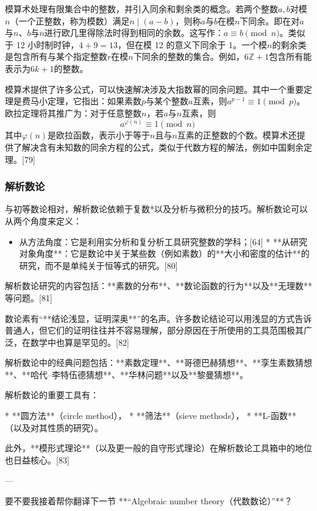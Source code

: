 模算术处理有限集合中的整数，并引入同余和剩余类的概念。若两个整数$a, b$对模$n$（一个正整数，称为模数）满足$n \mid (a-b)$，则称$a$与$b$在模$n$下同余。即在对$a$与$n$、$b$与$n$进行欧几里得除法时得到相同的余数。这写作：$a \equiv b \pmod{n}$。类似于 12 小时制时钟，$4 + 9 = 13$，但在模 12 的意义下同余于 1。一个模$n$的剩余类是包含所有与某个指定整数$r$在模$n$下同余的整数的集合。例如，$6\mathbb{Z} + 1$包含所有能表示为$6k+1$的整数。

模算术提供了许多公式，可以快速解决涉及大指数幂的同余问题。其中一个重要定理是费马小定理，它指出：如果素数$p$与某个整数$a$互素，则$a^{p-1} \equiv 1 \pmod{p}$。欧拉定理将其推广为：对于任意整数$n$，若$a$与$n$互素，则
$$
a^{\varphi(n)} \equiv 1 \pmod{n}~
$$
其中$\varphi(n)$是欧拉函数，表示小于等于$n$且与$n$互素的正整数的个数。模算术还提供了解决含有未知数的同余方程的公式，类似于代数方程的解法，例如中国剩余定理。[79]
\subsubsection{解析数论}
与初等数论相对，解析数论依赖于复数*以及分析与微积分的技巧。解析数论可以从两个角度来定义：

\begin{itemize}
\item 从方法角度：它是利用实分析和复分析工具研究整数的学科；[64]
* **从研究对象角度**：它是数论中关于某些数（例如素数）的**大小和密度的估计**的研究，而不是单纯关于恒等式的研究。[80]
\end{itemize}

解析数论研究的内容包括：**素数的分布**、**数论函数的行为**以及**无理数**等问题。[81]

数论素有“**结论浅显，证明深奥**”的名声。许多数论结论可以用浅显的方式告诉普通人，但它们的证明往往并不容易理解，部分原因在于所使用的工具范围极其广泛，在数学中也算是罕见的。[82]

解析数论中的经典问题包括：**素数定理**、**哥德巴赫猜想**、**孪生素数猜想**、**哈代–李特伍德猜想**、**华林问题**以及**黎曼猜想**。

解析数论的重要工具有：

* **圆方法**（circle method），
* **筛法**（sieve methods），
* **L-函数**（以及对其性质的研究）。

此外，**模形式理论**（以及更一般的自守形式理论）在解析数论工具箱中的地位也日益核心。[83]

---

要不要我接着帮你翻译下一节 **“Algebraic number theory（代数数论）”**？
